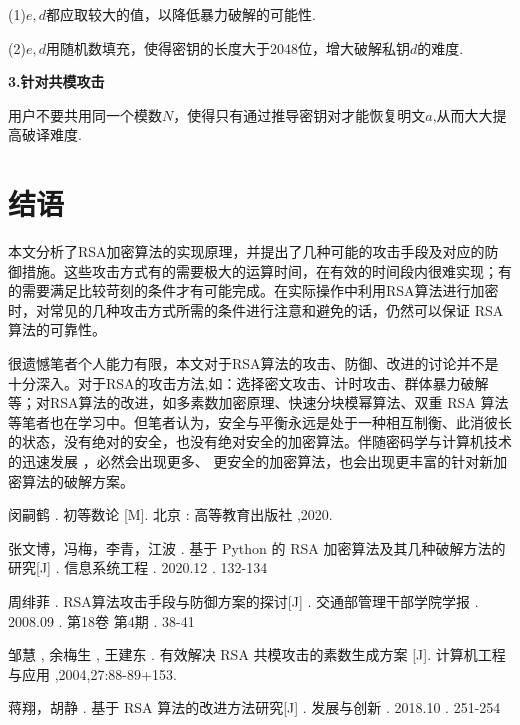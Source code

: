 \documentclass[a4paper,12pt]{article}
\newcommand{\upcite}[1]{\textsuperscript{\textsuperscript{\cite{#1}}}}
\begin{document}
(1)$e,d$都应取较大的值，以降低暴力破解的可能性.\par 
(2)$e,d$用随机数填充，使得密钥的长度大于2048位，增大破解私钥$d$的难度.\par 
\quad  \par 


\textbf{3.针对共模攻击}\par
用户不要共用同一个模数$ N$，使得只有通过推导密钥对才能恢复明文$a$,从而大大提高破译难度.



\section{结语}

本文分析了RSA加密算法的实现原理，并提出了几种可能的攻击手段及对应的防御措施。这些攻击方式有的需要极大的运算时间，在有效的时间段内很难实现；有的需要满足比较苛刻的条件才有可能完成。在实际操作中利用RSA算法进行加密时，对常见的几种攻击方式所需的条件进行注意和避免的话，仍然可以保证 RSA 算法的可靠性。\par 
很遗憾笔者个人能力有限，本文对于RSA算法的攻击、防御、改进的讨论并不是十分深入。对于RSA的攻击方法,如：选择密文攻击、计时攻击、群体暴力破解等\upcite{黑客破解}；对RSA算法的改进，如多素数加密原理、快速分块模幂算法、双重 RSA 算法等\upcite{RSA原理}笔者也在学习中。但笔者认为，安全与平衡永远是处于一种相互制衡、此消彼长的状态，没有绝对的安全，也没有绝对安全的加密算法。伴随密码学与计算机技术的迅速发展 ，必然会出现更多、 更安全的加密算法，也会出现更丰富的针对新加密算法的破解方案。\par 












{} %

\begin{thebibliography}{99}


闵嗣鹤 . 初等数论 [M]. 北京 : 高等教育出版社 ,2020.

张文博，冯梅，李青，江波 . 基于 Python 的 RSA 加密算法及其几种破解方法的研究[J] . 信息系统工程 . 2020.12 . 132-134

周绯菲 . RSA算法攻击手段与防御方案的探讨[J] . 交通部管理干部学院学报 . 2008.09 . 第18卷 第4期 . 38-41

邹慧 , 余梅生 , 王建东 . 有效解决 RSA 共模攻击的素数生成方案 [J]. 计算机工程与应用 ,2004,27:88-89+153.

蒋翔，胡静 . 基于 RSA 算法的改进方法研究[J] . 发展与创新 . 2018.10 . 251-254


\end{thebibliography}
\end{document}
